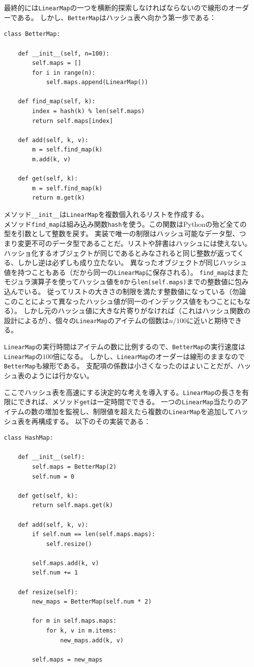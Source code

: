 \documentclass[a4j,12pt,makeidx]{jbook}
\begin{document}
最終的には{\tt LinearMap}の一つを横断的探索しなければならないので線形のオーダーである。
しかし、{\tt BetterMap}はハッシュ表へ向かう第一歩である：
\begin{verbatim}
class BetterMap:

    def __init__(self, n=100):
        self.maps = []
        for i in range(n):
            self.maps.append(LinearMap())

    def find_map(self, k):
        index = hash(k) % len(self.maps)
        return self.maps[index]

    def add(self, k, v):
        m = self.find_map(k)
        m.add(k, v)

    def get(self, k):
        m = self.find_map(k)
        return m.get(k)
\end{verbatim}
メソッド{\verb"__init__"}は{\tt LinearMap}を複数個入れるリストを作成する。\\
メソッド{\tt find\_map}は組み込み関数{\tt hash}を使う。この関数はPythonの殆ど全ての型を引数として整数を戻す。
実装で唯一の制限はハッシュ可能なデータ型、つまり変更不可のデータ型であることだ。リストや辞書はハッシュには使えない。
ハッショ化するオブジェクトが同じであるとみなされると同じ整数が返ってくる、しかし逆は必ずしも成り立たない。
異なったオブジェクトが同じハッシュ値を持つこともある（だから同一の{\tt LinearMap}に保存される）。
{\tt find\_map}はまたモジュラ演算子を使ってハッシュ値を{\tt 0}から{\tt len(self.maps)}までの整数値に包み込んでいる。
従ってリストの大きさの制限を満たす整数値になっている（勿論このことによって異なったハッシュ値が同一のインデックス値をもつことにもなる）。
しかし元のハッシュ値に大きな片寄りがなければ（これはハッシュ関数の設計によるが）、個々の{\tt LinearMap}のアイテムの個数は$n/100$に近いと期待できる。\par
{\tt LinearMap}の実行時間はアイテムの数に比例するので、{\tt BetterMap}の実行速度は{\tt LinearMap}の$100$倍になる。
しかし、{\tt LinearMap}のオーダーは線形のままなので{\tt BetterMap}も線形である。
支配項の係数は小さくなったのはよいことだが、ハッシュ表のようには行かない。\par
ここでハッシュ表を高速にする決定的な考えを導入する。{\tt LinearMap}の長さを有限にできれば、メソッド{\tt get}は一定時間でできる。
一つの{\tt LinearMap}当たりのアイテムの数の増加を監視し、制限値を超えたら複数の{\tt LinearMap}を追加してハッシュ表を再構成する。
以下のその実装である：
\begin{verbatim}
class HashMap:

    def __init__(self):
        self.maps = BetterMap(2)
        self.num = 0

    def get(self, k):
        return self.maps.get(k)

    def add(self, k, v):
        if self.num == len(self.maps.maps):
            self.resize()

        self.maps.add(k, v)
        self.num += 1

    def resize(self):
        new_maps = BetterMap(self.num * 2)

        for m in self.maps.maps:
            for k, v in m.items:
                new_maps.add(k, v)

        self.maps = new_maps
\end{verbatim}
\end{document}

